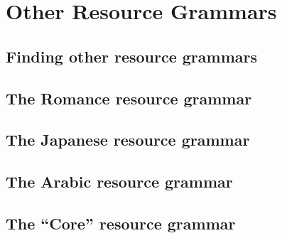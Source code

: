 \chapter{Other Resource Grammars}
\label{Chapter:OtherResourceGrammar}

\author{Manny Rayner}

\section{Finding other resource grammars}
\label{Section:FindingResourceGrammars}

\section{The Romance resource grammar}
\label{Section:RomanceResourceGrammar}

\section{The Japanese resource grammar}
\label{Section:JapaneseResourceGrammar}

\section{The Arabic resource grammar}
\label{Section:ArabicResourceGrammar}

\section{The ``Core'' resource grammar}
\label{Section:CoreResourceGrammar}
